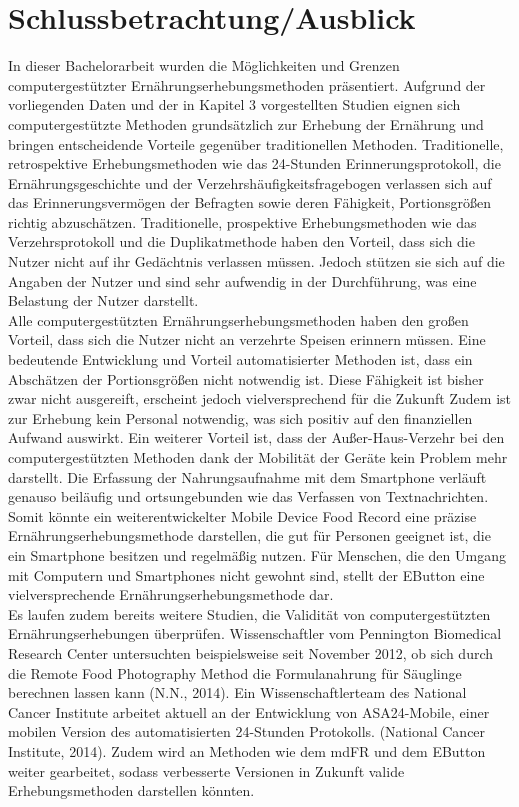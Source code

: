 \newpage
\section{Schlussbetrachtung/Ausblick}

In dieser Bachelorarbeit wurden die Möglichkeiten und Grenzen computergestützter Ernährungserhebungsmethoden präsentiert. Aufgrund der vorliegenden Daten und der in Kapitel 3 vorgestellten Studien eignen sich computergestützte Methoden grundsätzlich zur Erhebung der Ernährung und bringen entscheidende Vorteile gegenüber traditionellen Methoden. Traditionelle, retrospektive Erhebungsmethoden wie das 24-Stunden Erinnerungsprotokoll, die Ernährungsgeschichte und der Verzehrshäufigkeitsfragebogen verlassen sich auf das Erinnerungsvermögen der Befragten sowie deren Fähigkeit, Portionsgrößen richtig abzuschätzen. 
Traditionelle, prospektive Erhebungsmethoden wie das Verzehrsprotokoll und die Duplikatmethode haben den Vorteil, dass sich die Nutzer nicht auf ihr Gedächtnis verlassen müssen. Jedoch stützen sie sich auf die Angaben der Nutzer und sind sehr aufwendig in der Durchführung, was eine Belastung der Nutzer darstellt. \\
Alle computergestützten Ernährungserhebungsmethoden haben den großen Vorteil, dass sich die Nutzer nicht an verzehrte Speisen erinnern müssen. Eine bedeutende Entwicklung und Vorteil automatisierter Methoden ist, dass ein Abschätzen der Portionsgrößen nicht notwendig ist. Diese Fähigkeit ist bisher zwar nicht ausgereift, erscheint jedoch vielversprechend für die Zukunft Zudem ist zur Erhebung kein Personal notwendig, was sich positiv auf den finanziellen Aufwand auswirkt. Ein weiterer Vorteil ist, dass der 
Außer-Haus-Verzehr bei den computergestützten Methoden dank der Mobilität der Geräte kein Problem mehr darstellt. Die Erfassung der Nahrungsaufnahme mit dem Smartphone verläuft genauso beiläufig und ortsungebunden wie das Verfassen von Textnachrichten. Somit könnte ein weiterentwickelter Mobile Device Food Record eine präzise Ernährungserhebungsmethode darstellen, die gut für Personen geeignet ist, die ein Smartphone besitzen und regelmäßig nutzen. 
Für Menschen, die den Umgang mit Computern und Smartphones nicht gewohnt sind, stellt der EButton eine vielversprechende Ernährungserhebungsmethode dar.\\
Es laufen zudem bereits weitere Studien, die Validität von computergestützten Ernährungserhebungen überprüfen. Wissenschaftler vom Pennington Biomedical Research Center untersuchten beispielsweise seit November 2012, ob sich durch die Remote Food Photography Method die Formulanahrung für Säuglinge berechnen lassen kann (N.N., 2014). Ein Wissenschaftlerteam des National Cancer Institute arbeitet aktuell an der Entwicklung von ASA24-Mobile, einer mobilen Version des automatisierten 24-Stunden Protokolls. (National Cancer Institute, 2014). Zudem wird an Methoden wie dem mdFR und dem EButton weiter gearbeitet, sodass verbesserte Versionen in Zukunft valide Erhebungsmethoden darstellen könnten. 

\newpage
